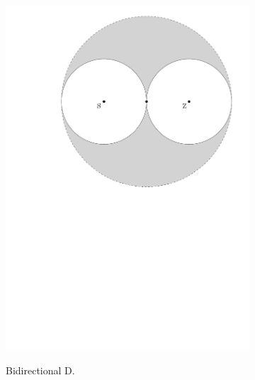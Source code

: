 \begin{figure}[h]
\begin{subfigure}{0.30\textwidth}
\includegraphics[width = \textwidth]{../media/bidijkstra.pdf} \\
\caption{Bidirectional D.}
\label{fig:biD}
\end{subfigure}
\begin{subfigure}{0.30\textwidth}
\centering
\vspace{1.1cm}

\end{subfigure}
\end{figure}

